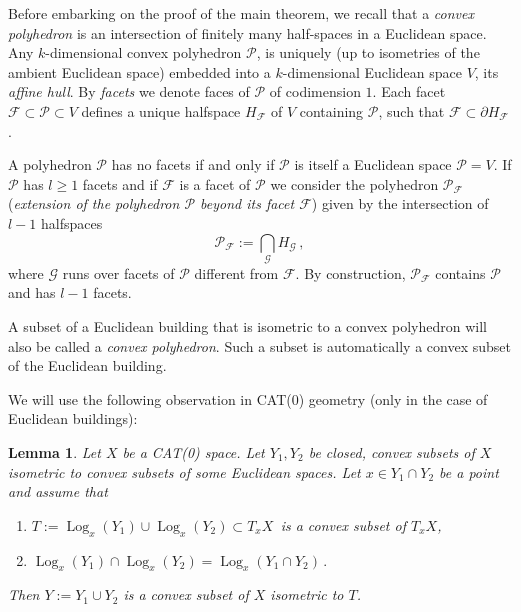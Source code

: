 \documentclass[12pt,leqno]{amsart}
\numberwithin{equation}{section}
\newtheorem{lem}[thm]{Lemma}
\theoremstyle{definition}
\theoremstyle{remark}
\begin{document}
	Before embarking on the proof of the main theorem, we recall that a \emph{convex polyhedron} is an intersection of finitely many half-spaces in a Euclidean space.  Any $k$-dimensional convex polyhedron $\mathcal P$, is uniquely (up to isometries of the ambient Euclidean space) embedded into a $k$-dimensional Euclidean space $V$, its \emph{affine hull}.  
	 By \emph{facets} we denote faces of $\mathcal P$ of codimension $1$. Each facet $\mathcal F\subset \mathcal P\subset V$ defines a unique  halfspace $H_\mathcal F$ of $V$ containing $\mathcal P$, such that $\mathcal F\subset \partial H_{\mathcal F}$.
	 
   
	
	A polyhedron $\mathcal P$ has no facets if and only if $\mathcal P$ is itself a Euclidean space $\mathcal P=V$.   If $\mathcal P$ has $l\geq 1$ facets and if $\mathcal F$ is a facet of $\mathcal P$ we consider the  polyhedron $\mathcal P_\mathcal F$  (\emph{extension of the polyhedron $\mathcal P$  beyond its facet $\mathcal F$}) given by the intersection of $l-1$ halfspaces 
	$$\mathcal P_\mathcal F:=\bigcap_{\mathcal G} H_\mathcal G\,,$$
	where $\mathcal G$ runs over facets of $\mathcal P$ different from $\mathcal F$.  By construction, $\mathcal P_\mathcal F$  contains $\mathcal P$ and has $l-1$ facets. 
	
	
	
	
	A subset of a Euclidean  building that is isometric to a convex polyhedron will also be called a \emph{convex polyhedron}.  Such a subset is automatically a convex subset of the Euclidean building. 

	
We will use the following observation in CAT(0) geometry (only in the case of Euclidean buildings):

\begin{lem} \label{lem: final}
	Let $X$ be a CAT(0) space.  Let $Y_1,Y_2 $ be closed, convex subsets of $X$ isometric to convex subsets of some Euclidean spaces.  Let $x\in  Y_1\cap Y_2$ be a point and assume that
	\begin{enumerate} 
	\item $T:={\operatorname{Log}}_x (Y_1) \cup {\operatorname{Log}}_x (Y_2) \subset T_xX \,$ is a convex subset of $T_xX$,
	\item ${\operatorname{Log}}_x (Y_1) \cap {\operatorname{Log}}_x (Y_2) ={\operatorname{Log}}_x (Y_1\cap Y_2)\,.$
	\end{enumerate}
	Then $Y:=Y_1\cup Y_2$ is a  convex subset of $X$ isometric to $T$. 
\end{lem}
	
\end{document}
